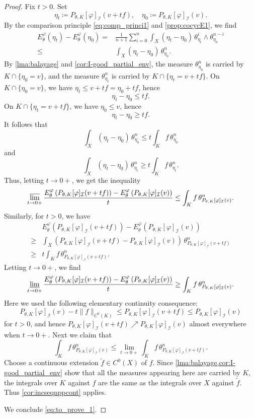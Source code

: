 \begin{proof}
Fix $t>0$.
Set
\[
\eta_t\coloneqq P_{\theta,K}[\varphi]_{\mathcal I}(v+tf),\quad \eta_0\coloneqq P_{\theta,K}[\varphi]_{\mathcal I}(v).
\]
By the comparison principle \eqref{eq:comp_princi1} and \cref{prop:cocycE1}, we find
\[
\begin{aligned}
E_{\theta}^{\varphi}(\eta_t)-E_{\theta}^{\varphi}(\eta_0)
={}&\frac{1}{n+1}\sum_{i=0}^n\int_X(\eta_t-\eta_0)\,
\theta_{\eta_t}^i\wedge\theta_{\eta_0}^{n-i}\\
\leq{}& \int_X(\eta_t-\eta_0)\,\theta_{\eta_0}^n.
\end{aligned}
\]
By \cref{lma:balayage} and \cref{cor:I-good_partial_env}, the measure $\theta_{\eta_0}^n$ is carried by $K\cap\{\eta_0=v\}$, and the measure $\theta_{\eta_t}^n$ is carried by $K\cap\{\eta_t=v+tf\}$.
On $K\cap\{\eta_0=v\}$, we have $\eta_t\leq v+tf=\eta_0+tf$, hence
\[
\eta_t-\eta_0\leq tf.
\]
On $K\cap\{\eta_t=v+tf\}$, we have $\eta_0\leq v$, hence
\[
\eta_t-\eta_0\geq tf.
\]
It follows that
\[
\int_X(\eta_t-\eta_0)\,\theta_{\eta_0}^n \leq t\int_K f\,\theta_{\eta_0}^n
\]
and
\[
\int_X(\eta_t-\eta_0)\,\theta_{\eta_t}^n \geq t\int_K f\,\theta_{\eta_t}^n.
\]
Thus, letting $t\to 0+$, we get the inequality
\[
\varlimsup_{t\to 0+}\frac{E_{\theta}^{\varphi}\left(P_{\theta,K}[\varphi]_{\mathcal{I}}(v+tf)\right)-E_{\theta}^{\varphi}\left(P_{\theta,K}[\varphi]_{\mathcal{I}}(v)\right)}{t}\leq\int_K f\,\theta^n_{P_{\theta,K}[\varphi]_{\mathcal{I}}(v)}.
\]
Similarly, for $t>0$, we have
\[
\begin{aligned}
&E_{\theta}^{\varphi}\left(P_{\theta,K}[\varphi]_{\mathcal{I}}(v+tf)\right)-E_{\theta}^{\varphi}\left(P_{\theta,K}[\varphi]_{\mathcal{I}}(v)\right)\\
\geq & \int_X \left(P_{\theta,K}[\varphi]_{\mathcal{I}}(v+tf)-P_{\theta,K}[\varphi]_{\mathcal{I}}(v)\right)\,\theta_{P_{\theta,K}[\varphi]_{\mathcal{I}}(v+tf)}^n\\
\geq & t\int_K f\,\theta_{P_{\theta,K}[\varphi]_{\mathcal{I}}(v+tf)}^n.
\end{aligned}
\]
Letting $t\to 0+$, we find
\[
\varliminf_{t\to 0+}\frac{E_{\theta}^{\varphi}\left(P_{\theta,K}[\varphi]_{\mathcal{I}}(v+tf)\right)-E_{\theta}^{\varphi}\left(P_{\theta,K}[\varphi]_{\mathcal{I}}(v)\right)}{t}\geq\int_K f\,\theta^n_{P_{\theta,K}[\varphi]_{\mathcal{I}}(v)}.
\]
Here we used the following elementary continuity consequence:
\[
P_{\theta,K}[\varphi]_{\mathcal{I}}(v)-t\|f\|_{C^0(K)}
\leq P_{\theta,K}[\varphi]_{\mathcal{I}}(v+tf)
\leq P_{\theta,K}[\varphi]_{\mathcal{I}}(v)
\]
for $t>0$, and hence $P_{\theta,K}[\varphi]_{\mathcal{I}}(v+tf) \nearrow P_{\theta,K}[\varphi]_{\mathcal{I}}(v)$ almost everywhere when $t\to 0+$.
Next we claim that
\[
    \int_K f\,\theta^n_{P_{\theta,K}[\varphi]_{\mathcal{I}}(v)}\leq \lim_{t\to 0+}  \int_K f\,\theta_{P_{\theta,K}[\varphi]_{\mathcal{I}}(v+tf)}^n.
\]
Choose a continuous extension $\tilde f\in C^0(X)$ of $f$. Since \cref{lma:balayage,cor:I-good_partial_env} show that all the measures appearing here are carried by $K$, the integrals over $K$ against $f$ are the same as the integrals over $X$ against $\tilde f$. Thus \cref{cor:incseqnppcont} applies.

We conclude \eqref{eq:to_prove_1}.
\end{proof}

